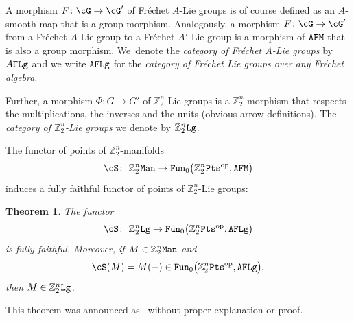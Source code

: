 \documentclass[pdftex]{sigma}%
\newcommand{\op}[1]{\operatorname{#1}}
\newcommand{\Z}{{\mathbb Z}}
\newcommand{\0}{\otimes}
\newcommand{\z}{\Z_2^n}
\numberwithin{equation}{section}
\newtheorem{Theorem}{Theorem}[section]
\begin{document}
A morphism $F\colon \cG\to \cG'$ of Fr\'echet $A$-Lie groups is of course defined as an $A$-smooth map that is a group morphism. Analogously, a morphism $F\colon \cG\to \cG'$ from a Fr\'echet $A$-Lie group to a Fr\'echet $A'$-Lie group is a morphism of $\tt AFM$ that is also a group morphism. We~denote the {\it category of Fr\'echet $A$-Lie groups} by $A\tt FLg$ and we write $\tt AFLg$ for the {\it category of Fr\'echet Lie groups over any Fr\'echet algebra}.

Further, a morphism $\Phi\colon G\to G'$ of $\z$-Lie groups is a $\z$-morphism that respects the multiplications, the inverses and the units (obvious arrow definitions). The {\it category of $\z$-Lie groups} we denote by $\z\tt Lg$.

The functor of points of $\z$-manifolds
\begin{gather}\label{SMan}
\cS\colon\ \z{\tt Man}\to {\tt Fun}_0\big(\z{\tt Pts}^{\op{op}},{\tt AFM}\big)
\end{gather}
induces a fully faithful functor of points of $\z$-Lie groups:

\begin{Theorem}\label{FunPtsZLg}
The functor
\begin{gather}\label{ResSLg}
\cS\colon\ \z{\tt Lg}\to {\tt Fun}_0\big(\z{\tt Pts}^{\op{op}},{\tt AFLg}\big)
\end{gather}
is fully faithful. Moreover, if $M\in\z{\tt Man}$ and
\[
\cS(M)=M(-)\in{\tt Fun}_0\big(\z{\tt Pts}^{\op{op}},{\tt AFLg}\big),
\]
then $M\in\z{\tt Lg}$. \end{Theorem}

This theorem was announced as~\cite[Theorem 3.30]{Bruce:2019b} without proper explanation or proof.
\end{document}
